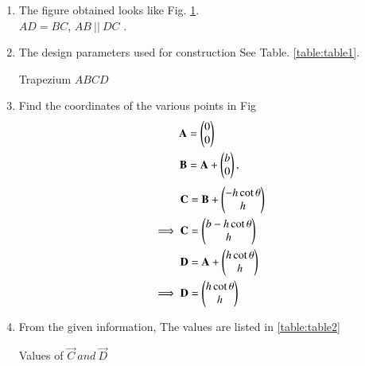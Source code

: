 \renewcommand{\theequation}{\theenumi}
\begin{enumerate}[label=\thesection.\arabic*.,ref=\thesection.\theenumi]

\begin{figure}[!ht]
\centering
\resizebox{\columnwidth}{!}{}
\caption{Trapezium by Latex-Tikz}
\label{fig:trapezium}	
\end{figure}

\item The figure obtained looks like Fig. \ref{fig:trapezium}.\\
 $AD = BC$, $AB \ ||\  DC$ . 

\item The design parameters used for construction See Table. \ref{table:table1}.
\begin{table}[ht!]
\centering

\caption{Trapezium $ABCD$}
\label{table:table1}	
\end{table} 

\item Find the coordinates of the various points in Fig
\begin{align}
\mathbf{A} &=\begin{pmatrix}0\\0\end{pmatrix} \label{eq:constr_a}\\
\mathbf{B} &=\mathbf{A} + \begin{pmatrix}b\\0\end{pmatrix}, \label{eq:constr_b}
\end{align}
\begin{align}
\mathbf{C} &= \mathbf{B} + \begin{pmatrix}-h\cot{\theta}\\h\end{pmatrix}\\
\implies \mathbf{C} &= \begin{pmatrix}b - h\cot{\theta}\\h\end{pmatrix}\label{eq:constr_c}\\ 
\mathbf{D} &= \mathbf{A} + \begin{pmatrix}h\cot{\theta}\\h\end{pmatrix}\\
\implies \mathbf{D} &= \begin{pmatrix}h\cot{\theta}\\h\end{pmatrix}\label{eq:constr_d}			
\end{align}

\item
\solution From the given information, 
The values are listed in \ref{table:table2}\\
\begin{table}[ht!]
\centering

\caption{Values of $\vec{C}\  and\  \vec{D}$}
\label{table:table2}	
\end{table} 


\end{enumerate}
